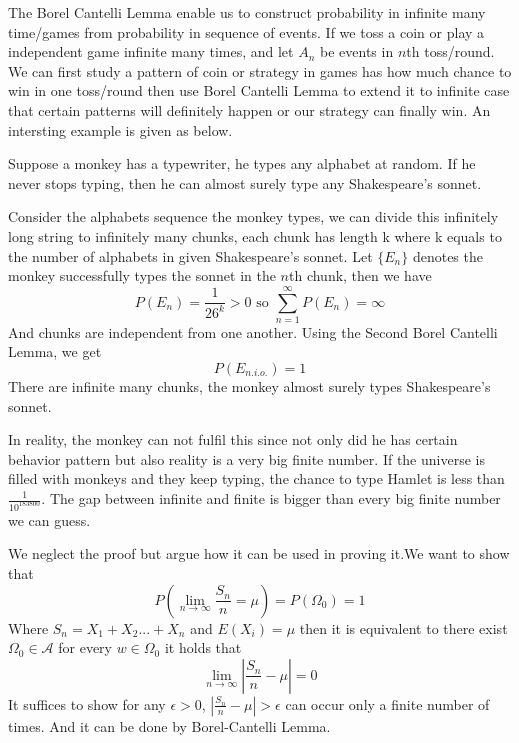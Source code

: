 \documentclass[../Probability_Theory.tex]{subfiles}
\begin{document}
\begin{intuition}
The Borel Cantelli Lemma enable us to construct probability in infinite many time/games from probability in sequence of events. If we toss a coin or play a independent game infinite many times, and let $A_n$ be events in $n$th toss/round. We can first study a pattern of coin or strategy in games has how much chance to win in one toss/round then use Borel Cantelli Lemma to extend it to infinite case that certain patterns will definitely happen or our strategy can finally win. An intersting example is given as below.
\end{intuition}
\begin{example}
Suppose a monkey has a typewriter, he types any alphabet at random. If he never stops typing, then he can almost surely type any Shakespeare's sonnet.
\end{example}
\begin{solve}
Consider the alphabets sequence the monkey types, we can divide this infinitely long string to infinitely many chunks, each chunk has length k where k equals to the number of alphabets in given Shakespeare's sonnet. Let $\{E_n\}$ denotes the monkey successfully types the sonnet in the $n$th chunk, then we have 
$$P(E_n)=\frac{1}{26^k}>0 \text{ so }\sum_{n=1}^\infty P(E_n)=\infty$$
And chunks are independent from one another. Using the Second Borel Cantelli Lemma, we get
$$P(E_{n.i.o.})=1$$ 
There are infinite many chunks, the monkey almost surely types Shakespeare's sonnet.
\end{solve}
\begin{remark}
In reality, the monkey can not fulfil this since not only did he has certain behavior pattern but also reality is a very big finite number. If the universe is filled with monkeys and they keep typing, the chance to type Hamlet is less than $\frac{1}{10^{183800}}$. The gap between infinite and finite is bigger than every big finite number we can guess.  
\end{remark}
\begin{example}We neglect the proof but argue how it can be used in proving it.We want to show that $$P(\lim_{n\rightarrow\infty}\frac{S_n}{n}=\mu)=P(\Omega_0)=1$$ 
Where $S_n=X_1+X_2...+X_n$ and $E(X_i)=\mu$ then it is equivalent to there exist $\Omega_0\in \mathcal{A}$ for every $w\in \Omega_0$ it holds that $$\lim_{n\rightarrow\infty}|\frac{S_n}{n}-\mu|=0$$ 
It suffices to show for any $\epsilon>0$, $|\frac{S_n}{n}-\mu|>\epsilon$ can occur only a finite number of times. And it can be done by Borel-Cantelli Lemma.
\end{example}
\end{document}
